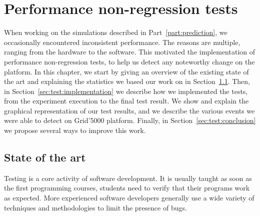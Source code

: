 \chapter{Performance non-regression tests}%
\label{chapter:experiment:tests}
    When working on the simulations described in Part~\ref{part:prediction}, we occasionally encountered inconsistent
    performance. The reasons are multiple, ranging from the hardware to the software. This motivated the implementation
    of performance non-regression tests, to help us detect any noteworthy change on the platform. In this chapter, we
    start by giving an overview of the existing state of the art and explaining the statistics we based our work on in
    Section~\ref{sec:test:state_of_art}. Then, in Section~\ref{sec:test:implementation} we describe how we implemented the
    tests, from the experiment execution to the final test result. We show and explain the graphical representation of
    our test results, and we describe the various events we were able to detect on Grid'5000 platform. Finally, in
    Section~\ref{sec:test:conclusion} we propose several ways to improve this work.

    \section{State of the art}%
    \label{sec:test:state_of_art}

        Testing is a core activity of software development. It is usually taught as soon as the first programming courses,
        students need to verify that their programs work as expected. More experienced software developers generally
        use a wide variety of techniques and methodologies to limit the presence of bugs.

